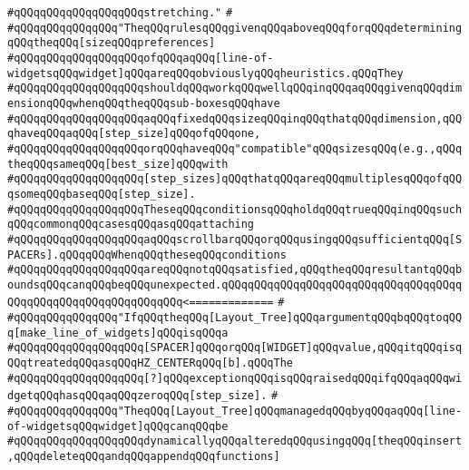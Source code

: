 \verb|#qQQqqQQqqQQqqQQqqQQqstretching."|\newline
\verb|#|\newline
\verb|#qQQqqQQqqQQqqQQq"TheqQQqrulesqQQqgivenqQQqaboveqQQqforqQQqdeterminingqQQqtheqQQq[sizeqQQqpreferences]|\newline
\verb|#qQQqqQQqqQQqqQQqqQQqofqQQqaqQQq[line-of-widgetsqQQqwidget]qQQqareqQQqobviouslyqQQqheuristics.qQQqThey|\newline
\verb|#qQQqqQQqqQQqqQQqqQQqshouldqQQqworkqQQqwellqQQqinqQQqaqQQqgivenqQQqdimensionqQQqwhenqQQqtheqQQqsub-boxesqQQqhave|\newline
\verb|#qQQqqQQqqQQqqQQqqQQqaqQQqfixedqQQqsizeqQQqinqQQqthatqQQqdimension,qQQqhaveqQQqaqQQq[step_size]qQQqofqQQqone,|\newline
\verb|#qQQqqQQqqQQqqQQqqQQqorqQQqhaveqQQq"compatible"qQQqsizesqQQq(e.g.,qQQqtheqQQqsameqQQq[best_size]qQQqwith|\newline
\verb|#qQQqqQQqqQQqqQQqqQQq[step_sizes]qQQqthatqQQqareqQQqmultiplesqQQqofqQQqsomeqQQqbaseqQQq[step_size].|\newline
\verb|#qQQqqQQqqQQqqQQqqQQqTheseqQQqconditionsqQQqholdqQQqtrueqQQqinqQQqsuchqQQqcommonqQQqcasesqQQqasqQQqattaching|\newline
\verb|#qQQqqQQqqQQqqQQqqQQqaqQQqscrollbarqQQqorqQQqusingqQQqsufficientqQQq[SPACERs].qQQqqQQqWhenqQQqtheseqQQqconditions|\newline
\verb|#qQQqqQQqqQQqqQQqqQQqareqQQqnotqQQqsatisfied,qQQqtheqQQqresultantqQQqboundsqQQqcanqQQqbeqQQqunexpected.qQQqqQQqqQQqqQQqqQQqqQQqqQQqqQQqqQQqqQQqqQQqqQQqqQQqqQQqqQQqqQQq<=============|\newline
\verb|#|\newline
\verb|#qQQqqQQqqQQqqQQq"IfqQQqtheqQQq[Layout_Tree]qQQqargumentqQQqbqQQqtoqQQq[make_line_of_widgets]qQQqisqQQqa|\newline
\verb|#qQQqqQQqqQQqqQQqqQQq[SPACER]qQQqorqQQq[WIDGET]qQQqvalue,qQQqitqQQqisqQQqtreatedqQQqasqQQqHZ_CENTERqQQq[b].qQQqThe|\newline
\verb|#qQQqqQQqqQQqqQQqqQQq[?]qQQqexceptionqQQqisqQQqraisedqQQqifqQQqaqQQqwidgetqQQqhasqQQqaqQQqzeroqQQq[step_size].|\newline
\verb|#|\newline
\verb|#qQQqqQQqqQQqqQQq"TheqQQq[Layout_Tree]qQQqmanagedqQQqbyqQQqaqQQq[line-of-widgetsqQQqwidget]qQQqcanqQQqbe|\newline
\verb|#qQQqqQQqqQQqqQQqqQQqdynamicallyqQQqalteredqQQqusingqQQq[theqQQqinsert,qQQqdeleteqQQqandqQQqappendqQQqfunctions]|\newline
